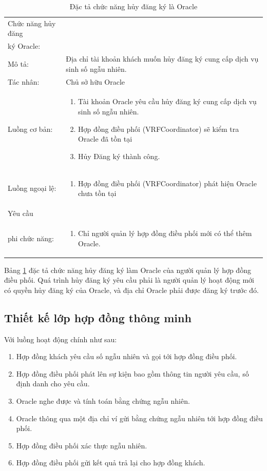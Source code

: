 \documentclass[../main.tex]{subfiles}
\begin{document}
\begin{table}[H]
\begin{tabularx}{\textwidth}{|l|X|}
Chức năng hủy đăng\\ ký Oracle:  &  \\
Mô tả:                  & Địa chỉ tài khoản khách muốn hủy đăng ký cung cấp dịch vụ sinh số ngẫu nhiên.\\
Tác nhân:               & Chủ sở hữu Oracle \\
Luồng cơ bản:           &
\begin{enumerate}
    \item Tài khoản Oracle yêu cầu hủy đăng ký cung cấp dịch vụ sinh số ngẫu nhiên.
    \item Hợp đồng điều phối (VRFCoordinator) sẽ kiểm tra Oracle đã tồn tại
    \item Hủy Đăng ký thành công.
\end{enumerate}\\
Luồng ngoại lệ:         &
\begin{enumerate}
    \item Hợp đồng điều phối (VRFCoordinator) phát hiện Oracle chưa tồn tại
\end{enumerate}\\
Yêu cầu                 &\\
phi chức năng:           & 
\begin{enumerate}
    \item Chỉ người quản lý hợp đồng điều phối mới có thể thêm Oracle.
\end{enumerate}\\
\end{tabularx}
\caption{Đặc tả chức năng hủy đăng ký là Oracle}
\label{table: 5}
\end{table}

Bảng \ref{table: 5} đặc tả chức năng hủy đăng ký làm Oracle của người quản lý hợp đồng điều phối. Quá trình hủy đăng ký yêu cầu phải là người quản lý hoạt động mới có quyền hủy đăng ký của Oracle, và địa chỉ Oracle phải được đăng ký trước đó. 

\subsection{Thiết kế lớp hợp đồng thông minh}
Với luồng hoạt động chính như sau:
\begin{enumerate}
    \item Hợp đồng khách yêu cầu số ngẫu nhiên và gọi tới hợp đồng điều phối.
    \item Hợp đồng điều phối phát lên sự kiện bao gồm thông tin người yêu cầu, số định danh cho yêu cầu.
    \item Oracle nghe được và tính toán bằng chứng ngẫu nhiên.
    \item Oracle thông qua một địa chỉ ví gửi bằng chứng ngẫu nhiên tới hợp đồng điều phối.
    \item Hợp đồng điều phối xác thực ngẫu nhiên.
    \item Hợp đồng điều phối gửi kết quả trả lại cho hợp đồng khách.
\end{enumerate}
\end{document}

